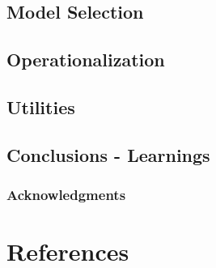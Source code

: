 \documentclass{article}
\begin{document}
 

\subsection{Model Selection}



\subsection{Operationalization}



\subsection{Utilities}




\subsection{Conclusions - Learnings}




\subsubsection*{Acknowledgments}


\section*{References}
\end{document}
